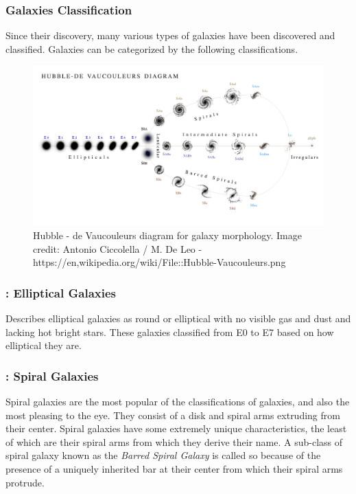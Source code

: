 \documentclass[12pt, oneside]{smuthesis}
\begin{document}
\subsubsection{\sc Galaxies Classification}

Since their discovery, many various types of galaxies have been discovered and classified. Galaxies can be categorized by the following classifications.

\begin{figure}
	\centering
	\includegraphics[width=\textwidth]{GalaxyClassificationInverted}
	\caption{Hubble - de Vaucouleurs diagram for galaxy morphology. Image credit: Antonio Ciccolella / M. De Leo - https://en,wikipedia.org/wiki/File::Hubble-Vaucouleurs.png}
	\label{fig:classDiagram}
\end{figure}

\subsubsection{: Elliptical Galaxies}

\cite{sag} Describes elliptical galaxies as round or elliptical with no visible gas and dust and lacking hot bright stars. These galaxies classified from E0 to E7 based on how elliptical they are.

\subsubsection{: Spiral Galaxies}

Spiral galaxies are the most popular of the classifications of galaxies, and also the most pleasing to the eye. They consist of a disk and spiral arms extruding from their center. Spiral galaxies have some extremely unique characteristics, the least of which are their spiral arms from which they derive their name. A sub-class of spiral galaxy known as the \textit{Barred Spiral Galaxy} is called so because of the presence of a uniquely inherited bar at their center from which their spiral arms protrude.
\end{document}
